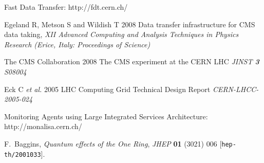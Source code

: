 

\begin{thebibliography}{1}

Fast Data Transfer: http://fdt.cern.ch/

  Egeland R, Metson S and Wildish T 2008 Data transfer infrastructure for CMS data taking,  {\it XII Advanced Computing and Analysis Techniques in Physics Research (Erice, Italy: Proceedings of Science)}

The CMS Collaboration 2008 The CMS experiment at the CERN LHC {\it JINST {\bf 3} S08004}

Eck C {\it et al.} 2005 LHC Computing Grid Technical Design Report {\it CERN-LHCC-2005-024}

Monitoring Agents using Large Integrated Services Architecture: http://monalisa.cern.ch/

F.~Baggins, \emph{Quantum effects of the One Ring},
\emph{JHEP} {\bf 01} (3021) 006 [{\tt hep-th/2001033}].

\end{thebibliography}
